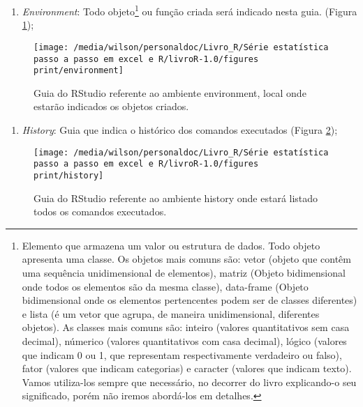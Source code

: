 \documentclass[14pt,titlepage, oneside, openany, a4paper]{book}
\providecommand{\tightlist}{%
  \setlength{\itemsep}{0pt}\setlength{\parskip}{0pt}}
\begin{document}
\begin{enumerate}
\def\labelenumi{\arabic{enumi}.}
\setcounter{enumi}{2}
\tightlist
\item
  \emph{Environment}: Todo objeto\footnote{Elemento que armazena um valor ou estrutura de dados. Todo objeto apresenta uma classe. Os objetos mais comuns são: vetor (objeto que contêm uma sequência unidimensional de elementos), matriz (Objeto bidimensional onde todos os elementos são da mesma classe), data-frame (Objeto bidimensional onde os elementos pertencentes podem ser de classes diferentes) e lista (é um vetor que agrupa, de maneira unidimensional, diferentes objetos). As classes mais comuns são: inteiro (valores quantitativos sem casa decimal), númerico (valores quantitativos com casa decimal), lógico (valores que indicam 0 ou 1, que representam respectivamente verdadeiro ou falso), fator (valores que indicam categorias) e caracter (valores que indicam texto). Vamos utiliza-los sempre que necessário, no decorrer do livro explicando-o seu significado, porém não iremos abordá-los em detalhes.} ou função criada será indicado nesta guia. (Figura \ref{fig:environment});
\end{enumerate}

\begin{figure}[H]

{\centering \texttt{[image: /media/wilson/personaldoc/Livro\_R/Série estatística passo a passo em excel e R/livroR-1.0/figures print/environment]} 

}

\caption{Guia do RStudio referente ao ambiente environment, local onde estarão indicados os objetos criados.}\label{fig:environment}
\end{figure}

\begin{enumerate}
\def\labelenumi{\arabic{enumi}.}
\setcounter{enumi}{3}
\tightlist
\item
  \emph{History}: Guia que indica o histórico dos comandos executados (Figura \ref{fig:history});
\end{enumerate}

\begin{figure}[H]

{\centering \texttt{[image: /media/wilson/personaldoc/Livro\_R/Série estatística passo a passo em excel e R/livroR-1.0/figures print/history]} 

}

\caption{Guia do RStudio referente ao ambiente history onde estará listado todos os comandos executados.}\label{fig:history}
\end{figure}
\end{document}
